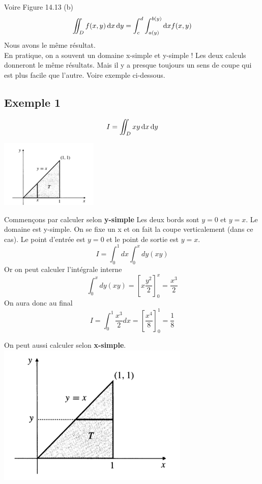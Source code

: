 Voire Figure 14.13 (b)
\[\iint_D f(x,y) \operatorname{d}\! x \operatorname{d}\! y = \int_c^d\int_{a(y)}^{b(y)} \operatorname{d}\! x f(x,y)\]
Nous avons le même résultat.\\
En pratique, on a souvent un domaine x-simple et y-simple ! Les deux calculs donneront le même résultats. Mais il y a presque toujours un sens de coupe qui est plus facile que l'autre. Voire exemple ci-dessous.

\subsection{Exemple 1}
\[ I=\iint_D xy \operatorname{d}\! x \operatorname{d}\! y \]
\begin{center}

\includegraphics[scale=1]{image2.png}

\end{center}
Commençons par calculer selon \textbf{y-simple}
Les deux bords sont $y=0$ et $y=x$. Le domaine est y-simple. On se fixe un x et on fait la coupe verticalement (dans ce cas). Le point d'entrée est $y=0$ et le point de sortie est $y=x$.
\[I=\int_0^1 dx \int_0^x dy(xy)\]
Or on peut calculer l'intégrale interne
\[\int_0^x dy(xy) = \left[ x \frac{y^2}{2} \right]_0^x = \frac{x^3}{2}\]
On aura donc au final
\[I=\int_0^1\frac{x^3}{2} dx = \left[\frac{x^4}{8}\right]_0^1= \frac{1}{8}\]

On peut aussi calculer selon \textbf{x-simple}.
\\
\includegraphics[scale=0.5]{image3}
\\


